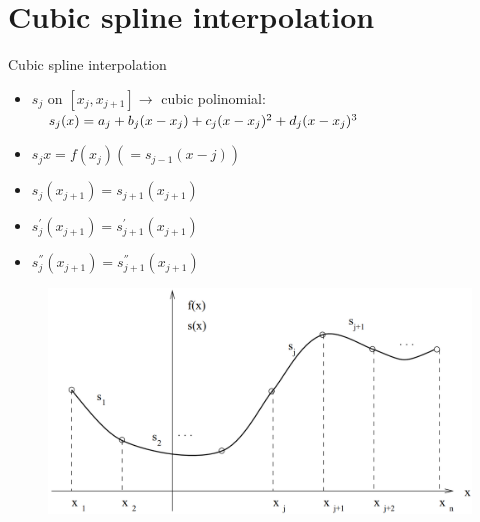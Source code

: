 \section{Cubic spline interpolation}
	\begin{frame}{Cubic spline interpolation}
		\begin{block}{}
			\begin{itemize}
				\item $s_{j}$ on $[x_{j},x_{j+1}] \rightarrow$ cubic polinomial:
                $\newline \ \ \ s_{j}(x)=a_{j}+b_{j}(x-x_{j})+c_{j}(x-x_{j})^{2}+
                d_{j}(x-x_{j})^{3}$
                \item $s_{j}x=f(x_{j})(=s_{j-1}(x-j))$
                \item $s_{j}(x_{j+1})=s_{j+1}(x_{j+1})$
                \item $s^{'}_{j}(x_{j+1})=s^{'}_{j+1}(x_{j+1})$
                \item $s^{''}_{j}(x_{j+1})=s^{''}_{j+1}(x_{j+1})$
			\end{itemize}
		\end{block}
        \begin{figure}[h]
			\includegraphics[width=.55\linewidth]{img/4/spline_img_4}
		\end{figure}
	\end{frame}